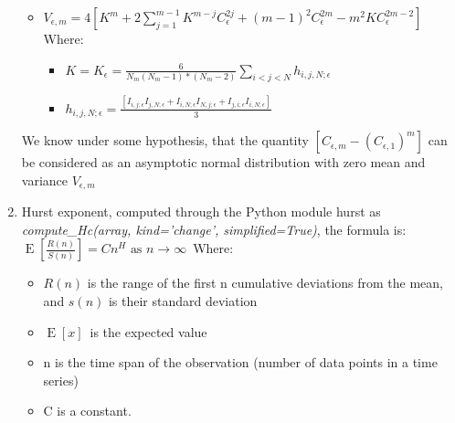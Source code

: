 \begin{enumerate}
\begin{itemize}
		\item $V_{\epsilon,m} = 4[{K}^{m} + 2\sum_{j=1}^{m-1}{K}^{m-j}{C}^{2j}_\epsilon + {(m-1)}^{2}{C}^{2m}_\epsilon - {m}^{2}K{C}^{2m-2}_\epsilon]$
		Where:
		\begin{itemize}
			\item $K=K_\epsilon = \frac{6}{N_m(N_m-1)*(N_m-2)}\sum_{i<j<N}h_{i,j,N;\epsilon}$
			\item $h_{i,j,N;\epsilon} = \frac{[I_{i,j;\epsilon}I_{j,N;\epsilon}+I_{i,N;\epsilon}I_{N,j;\epsilon}+I_{j,i;\epsilon}I_{i,N;\epsilon}]}{3}$
		\end{itemize}
	\end{itemize}
	We know under some hypothesis, that the quantity $[C_{\epsilon,m}-{(C_{\epsilon,1})}^{m}]$ can be considered as an asymptotic normal distribution with zero mean and variance $V_{\epsilon,m}$
	\item Hurst exponent, computed through the Python module hurst as \textit{compute\_Hc(array, kind='change', simplified=True)}, the formula is:\newline\newline
	$\operatorname{E} \left [ \frac{R(n)}{S(n)} \right ]=C n^H  \text{  as } n \to \infty  \, $
	\newline\newline Where:
	\begin{itemize}
		\item $R(n)$ is the range of the first n cumulative deviations from the mean, and $s(n)$ is their standard deviation
		\item $\operatorname{E} \left [x \right ] \,$ is the expected value
		\item n is the time span of the observation (number of data points in a time series)
		\item C is a constant.
	\end{itemize}
\end{enumerate}

